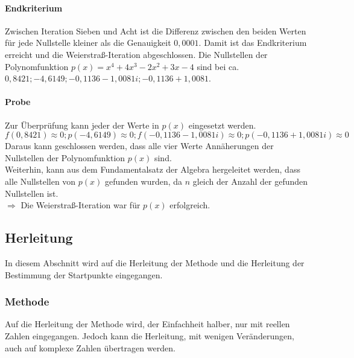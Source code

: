 \documentclass[12pt]{article}
\begin{document}
\paragraph{Endkriterium}
Zwischen Iteration Sieben und Acht ist die Differenz zwischen den beiden Werten für jede Nullstelle kleiner als die Genauigkeit $0,0001$. Damit ist das Endkriterium erreicht und die Weierstraß-Iteration abgeschlossen. 
Die Nullstellen der Polynomfunktion $p(x) = x^4 + 4x^3 - 2x^2 + 3x - 4$ sind bei ca. $0,8421; -4,6149; -0,1136 - 1,0081i; -0,1136 + 1,0081$. 
\paragraph{Probe}
Zur Überprüfung kann jeder der Werte in $p(x)$ eingesetzt werden.
\begin{displaymath}
    f(0,8421) \approx 0; p(-4,6149) \approx 0; f(-0,1136 - 1,0081i) \approx 0; p(-0,1136 + 1,0081i) \approx 0
\end{displaymath}
Daraus kann geschlossen werden, dass alle vier Werte Annäherungen der Nullstellen der Polynomfunktion $p(x)$ sind. \\
Weiterhin, kann aus dem Fundamentalsatz der Algebra hergeleitet werden, dass alle Nullstellen von $p(x)$ gefunden wurden, da $n$ gleich der Anzahl der gefunden Nullstellen ist. \\
$\Rightarrow$ Die Weierstraß-Iteration war für $p(x)$ erfolgreich.

\subsection{Herleitung}
In diesem Abschnitt wird auf die Herleitung der Methode und die Herleitung der Bestimmung der Startpunkte eingegangen.
\subsubsection{Methode}
Auf die Herleitung der Methode wird, der Einfachheit halber, nur mit reellen Zahlen eingegangen. Jedoch kann die Herleitung, mit wenigen Veränderungen, auch auf komplexe Zahlen übertragen werden.
\end{document}
